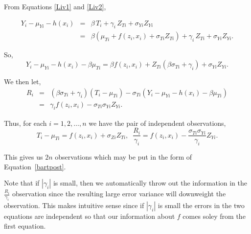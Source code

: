 From Equations \ref{Liv1} and \ref{Liv2},

\begin{eqnarray*}
Y_i - \mu_{Yi} - h(x_i) & = & \beta \, T_i + \gamma_i \, Z_{Ti} + \sigma_{Yi} Z_{Yi} \\
                        & = & \beta (\mu_{Ti} +f(z_i,x_i) + \sigma_{Ti} Z_{Ti}) +  \gamma_i \, Z_{Ti} + \sigma_{Yi} Z_{Yi}.
\end{eqnarray*}

So,
$$
Y_i - \mu_{Yi} - h(x_i) - \beta \mu_{Ti} = \beta f(z_i,x_i) + Z_{Ti} (\beta \sigma_{Ti} + \gamma_i) + \sigma_{Yi} Z_{Yi}.
$$

We then let,
\begin{eqnarray*}
R_i & = & (\beta \sigma_{Ti} + \gamma_i)(T_i - \mu_{Ti}) - \sigma_{Ti}(Y_i - \mu_{Yi} - h(x_i) - \beta \mu_{Ti}) \\
    & = & \gamma_i f(z_i,x_i) - \sigma_{Ti} \sigma_{Yi} Z_{Yi}.
\end{eqnarray*}

Thus, for each $i=1,2,\ldots,n$ we have the pair of independent observations,
$$
T_i - \mu_{Ti} = f(z_i,x_i) +  \sigma_{Zi} Z_{Ti}, \;\; 
\frac{R_i}{\gamma_i} = f(z_i,x_i) - \frac{\sigma_{Ti} \sigma_{Yi}}{\gamma_i} Z_{Yi}.
$$

This gives us $2n$ observations which may be put in the form of Equation~\ref{bartpost}.

Note that if $|\gamma_i|$ is small, then we automatically throw out the information in the 
$\frac{R_i}{\gamma_i}$ observation since the resulting large error variance will downweight the observation.
This makes intuitive sense since if $|\gamma_i|$ is small the errors in the two equations are independent so
that our information about $f$ comes soley from the first equation.

